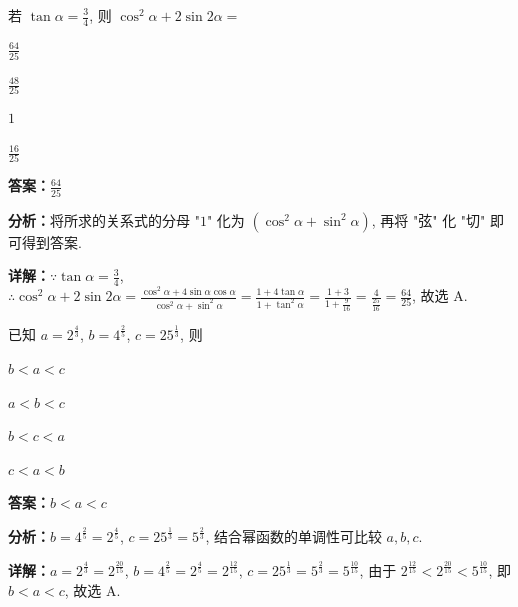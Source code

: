 \begin{question}[points=5]
若 $\tan\alpha=\frac{3}{4}$, 则 $\cos^2\alpha+2\sin2\alpha=$
\begin{choices}
  \item $\frac{64}{25}$
  \item $\frac{48}{25}$
  \item $1$
  \item $\frac{16}{25}$
\end{choices}
\begin{solution}
\textbf{答案：}$\frac{64}{25}$

\textbf{分析：}将所求的关系式的分母 "$1$" 化为 $(\cos^2\alpha+\sin^2\alpha)$, 再将 "弦" 化 "切" 即可得到答案.

\textbf{详解：}$\because\tan\alpha=\frac{3}{4}$, $\therefore\cos^2\alpha+2\sin2\alpha=\frac{\cos^2\alpha+4\sin\alpha\cos\alpha}{\cos^2\alpha+\sin^2\alpha}=\frac{1+4\tan\alpha}{1+\tan^2\alpha}=\frac{1+3}{1+\frac{9}{16}}=\frac{4}{\frac{25}{16}}=\frac{64}{25}$, 故选 A.
\end{solution}
\end{question}

\begin{question}[points=5]
已知 $a=2^{\frac{4}{3}}$, $b=4^{\frac{2}{5}}$, $c=25^{\frac{1}{3}}$, 则
\begin{choices}
  \item $b<a<c$
  \item $a<b<c$
  \item $b<c<a$
  \item $c<a<b$
\end{choices}
\begin{solution}
\textbf{答案：}$b<a<c$

\textbf{分析：}$b=4^{\frac{2}{5}}=2^{\frac{4}{5}}$, $c=25^{\frac{1}{3}}=5^{\frac{2}{3}}$, 结合幂函数的单调性可比较 $a,b,c$.

\textbf{详解：}$a=2^{\frac{4}{3}}=2^{\frac{20}{15}}$, $b=4^{\frac{2}{5}}=2^{\frac{4}{5}}=2^{\frac{12}{15}}$, $c=25^{\frac{1}{3}}=5^{\frac{2}{3}}=5^{\frac{10}{15}}$, 由于 $2^{\frac{12}{15}}<2^{\frac{20}{15}}<5^{\frac{10}{15}}$, 即 $b<a<c$, 故选 A.
\end{solution}
\end{question}


